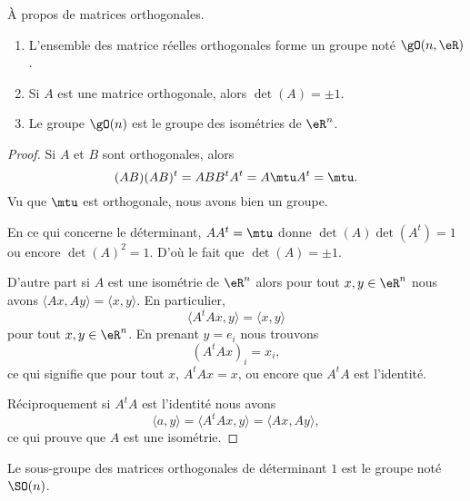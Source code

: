\begin{proposition}     \label{PropKBCXooOuEZcS}
    À propos de matrices orthogonales.
    \begin{enumerate}
        \item
            L'ensemble des matrice réelles orthogonales forme un groupe noté \( \gO(n,\eR)\).
        \item
            Si \( A\) est une matrice orthogonale, alors \( \det(A)=\pm 1\).
        \item       \label{ITEMooOWMBooHUatNb}
            Le groupe \( \gO(n)\) est le groupe des isométries de \( \eR^n\).
    \end{enumerate}
\end{proposition}

\begin{proof}
    Si \( A\) et \( B\) sont orthogonales, alors
    \begin{equation}
        (AB)(AB)^t=ABB^tA^t=A\mtu A^t=\mtu.
    \end{equation}
    Vu que \( \mtu\) est orthogonale, nous avons bien un groupe.

    En ce qui concerne le déterminant, \( AA^t=\mtu\) donne \( \det(A)\det(A^t)=1\) ou encore \( \det(A)^2=1\). D'où le fait que \( \det(A)=\pm 1\).

    D'autre part si \( A\) est une isométrie de \( \eR^n\) alors pour tout \( x,y\in \eR^n\) nous avons \( \langle Ax, Ay\rangle =\langle x, y\rangle \). En particulier,
    \begin{equation}
        \langle A^tAx, y\rangle =\langle x, y\rangle 
    \end{equation}
    pour tout \( x,y\in \eR^n\). En prenant \( y=e_i\) nous trouvons
    \begin{equation}
        (A^tAx)_i=x_i,
    \end{equation}
    ce qui signifie que pour tout \( x\), \( A^tAx=x\), ou encore que \( A^tA\) est l'identité.

    Réciproquement si \( A^tA\) est l'identité nous avons
    \begin{equation}
        \langle a, y\rangle =\langle A^tAx, y\rangle =\langle Ax, Ay\rangle ,
    \end{equation}
    ce qui prouve que \( A\) est une isométrie.
\end{proof}

\begin{definition}      \label{DEFooJLNQooBKTYUy}
    Le sous-groupe des matrices orthogonales de déterminant \( 1\) est le groupe  noté \( \SO(n)\).
\end{definition}

